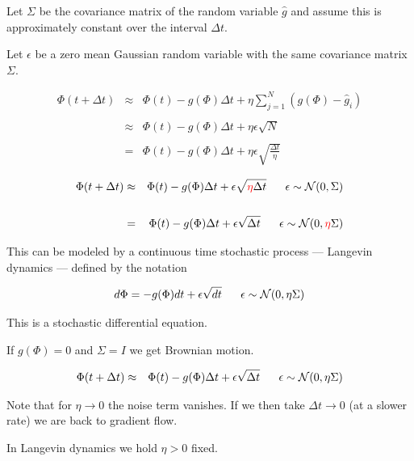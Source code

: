 {

Let $\Sigma$ be the covariance matrix of the random variable $\hat{g}$ and assume this is approximately constant over the interval $\Delta t$.

\vfill
Let $\epsilon$ be a zero mean Gaussian random variable with the same covariance matrix $\Sigma$.

\begin{eqnarray*}
\Phi(t + \Delta t) & \approx & \Phi(t) -g(\Phi)\Delta t + \eta \sum_{j=1}^N (g(\Phi) - \hat{g}_i) \\
\\
& \approx & \Phi(t) -g(\Phi)\Delta t + \eta \epsilon \sqrt{N} \\
\\
& = & \Phi(t) -g(\Phi)\Delta t + \eta \epsilon \sqrt{\frac{\Delta t}{\eta}}
\end{eqnarray*}



\begin{eqnarray*}
\Phi(t + \Delta t) & \approx & \Phi(t) -g(\Phi)\Delta t + \epsilon \sqrt{{\color{red} \eta}\Delta t}\;\;\;\;\;\; \epsilon \sim {\cal N}(0,\Sigma) \\
\\
& = & \Phi(t) -g(\Phi)\Delta t + \epsilon \sqrt{\Delta t}\;\;\;\;\;\; \epsilon \sim {\cal N}(0,{\color{red} \eta}\Sigma)
\end{eqnarray*}

\vfill
This can be modeled by a continuous time stochastic process --- Langevin dynamics --- defined by the notation

{\color{red} $$d\Phi =  -g(\Phi)dt + \epsilon \sqrt{dt}\;\;\;\;\;\; \epsilon \sim {\cal N}(0,\eta\Sigma)$$}

\vfill
This is a stochastic differential equation.

\vfill
If $g(\Phi) = 0$ and $\Sigma = I$ we get Brownian motion.


\begin{eqnarray*}
\Phi(t + \Delta t) & \approx & \Phi(t) -g(\Phi)\Delta t + \epsilon\sqrt{\Delta t}\;\;\;\;\;\; \epsilon \sim {\cal N}(0,\eta\Sigma)
\end{eqnarray*}

\vfill
Note that for $\eta \rightarrow 0$ the noise term vanishes.  If we then take $\Delta t \rightarrow 0$ (at a slower rate) we are back to gradient flow.

\vfill
In Langevin dynamics we hold $\eta > 0 $ fixed.

}
